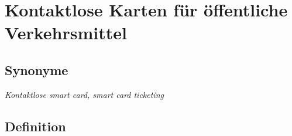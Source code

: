 \documentclass[
]{book}
\begin{document}
\hypertarget{contactless_cards}{%
\section{Kontaktlose Karten für öffentliche Verkehrsmittel}\label{contactless_cards}}

\hypertarget{synonyme-20}{%
\subsection*{Synonyme}\label{synonyme-20}}

\emph{Kontaktlose smart card, smart card ticketing}

\hypertarget{definition-26}{%
\subsection*{Definition}\label{definition-26}}
\end{document}
